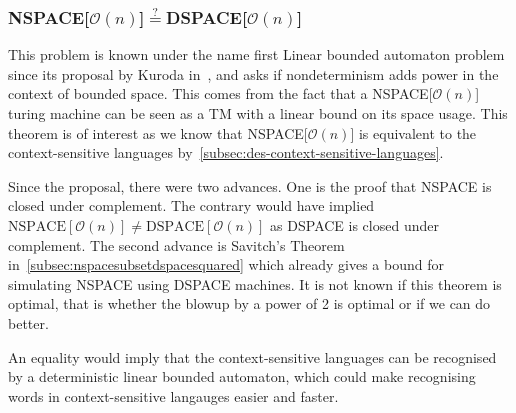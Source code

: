 \subsubsection{NSPACE[$\mathcal{O}(n)$]$\overset{?}{=}$DSPACE[$\mathcal{O}(n)$]}\label{subsec:nspacedspace}

This problem is known under the name first Linear bounded automaton problem since its proposal by Kuroda in~\cite{Kuroda1964}, and asks if nondeterminism adds power in the context of bounded space.
This comes from the fact that a NSPACE[$\mathcal{O}(n)$] turing machine can be seen as a TM with a linear bound on its space usage.
This theorem is of interest as we know that NSPACE[$\mathcal{O}(n)$] is equivalent to the context-sensitive languages by~\cref{subsec:des-context-sensitive-languages}.

Since the proposal, there were two advances.
One is the proof that NSPACE is closed under complement.
The contrary would have implied $\text{NSPACE}[\mathcal{O}(n)] \neq \text{DSPACE}[\mathcal{O}(n)]$ as DSPACE is closed under complement.
The second advance is Savitch's Theorem in~\cref{subsec:nspacesubsetdspacesquared} which already gives a bound for simulating NSPACE using DSPACE machines.
It is not known if this theorem is optimal, that is whether the blowup by a power of 2 is optimal or if we can do better.

An equality would imply that the context-sensitive languages can be recognised by a deterministic linear bounded automaton, which could make recognising words in context-sensitive langauges easier and faster.